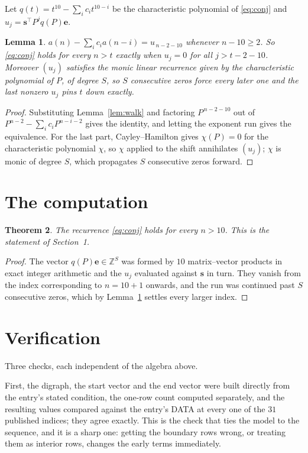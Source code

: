\documentclass[11pt,a4paper]{article}
\theoremstyle{plain}
\newtheorem{theorem}{Theorem}
\newtheorem{lemma}[theorem]{Lemma}
\theoremstyle{definition}
\begin{document}
Let $q(t)=t^{10}-\sum_i c_i t^{10-i}$ be the characteristic polynomial of
\eqref{eq:conj} and $u_j=\mathbf{s}^{\!\top}P^{j}q(P)\mathbf{e}$.

\begin{lemma}\label{lem:crit}
$a(n)-\sum_i c_i a(n-i)=u_{\,n-2-10}$ whenever $n-10\ge2$. So \eqref{eq:conj}
holds for every $n>t$ exactly when $u_j=0$ for all $j>t-2-10$. Moreover $(u_j)$
satisfies the monic linear recurrence given by the characteristic polynomial of $P$, of
degree $S$, so $S$ consecutive zeros force every later one and the last nonzero $u_j$ pins
$t$ down exactly.
\end{lemma}

\begin{proof}
Substituting Lemma~\ref{lem:walk} and factoring $P^{\,n-2-10}$ out of
$P^{n-2}-\sum_i c_i P^{n-i-2}$ gives the identity, and letting the exponent run gives the
equivalence. For the last part, Cayley--Hamilton gives $\chi(P)=0$ for the characteristic
polynomial $\chi$, so $\chi$ applied to the shift annihilates $(u_j)$; $\chi$ is monic of
degree $S$, which propagates $S$ consecutive zeros forward.
\end{proof}

\section{The computation}

\begin{theorem}
The recurrence \eqref{eq:conj} holds for every $n>10$. This is the statement of
Section~1.
\end{theorem}

\begin{proof}
The vector $q(P)\mathbf{e}\in\mathbb{Z}^{S}$ was formed by $10$ matrix--vector
products in exact integer arithmetic and the $u_j$ evaluated against $\mathbf{s}$ in turn.
They vanish from the index corresponding to $n=10+1$ onwards, and the run was continued
past $S$ consecutive zeros, which by Lemma~\ref{lem:crit} settles every larger index.
\end{proof}

\section{Verification}

Three checks, each independent of the algebra above.

First, the digraph, the start vector and the end vector were built directly from the
entry's stated condition, the one-row count computed separately, and the resulting values
compared against the entry's DATA at every one of the $31$ published indices; they
agree exactly. This is the check that ties the model to the sequence, and it is a sharp one:
getting the boundary rows wrong, or treating them as interior rows, changes the early terms
immediately.
\end{document}
